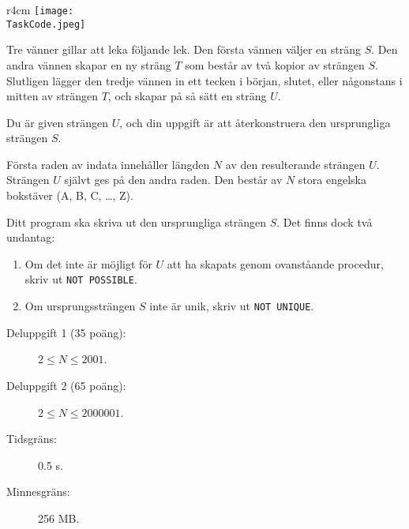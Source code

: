 \documentclass{boi2014-se}
\renewcommand{\TaskCode}{friends}
\begin{document}
    \begin{wrapfigure}{r}{4cm}
        \vspace{-24pt}
		\texttt{[image: \\TaskCode.jpeg]}
	\end{wrapfigure}
    Tre vänner gillar att leka följande lek. Den första vännen väljer en sträng $S$.
    Den andra vännen skapar en ny sträng $T$ som består av två kopior av strängen $S$.
    Slutligen lägger den tredje vännen in ett tecken i början, slutet, eller
    någonstans i mitten av strängen $T$, och skapar på så sätt en sträng $U$.

    \Task
    Du är given strängen $U$, och din uppgift är att återkonstruera den ursprungliga strängen $S$.

    \Input
    Första raden av indata innehåller längden $N$ av den resulterande strängen $U$.
    Strängen $U$ självt ges på den andra raden. Den består av $N$ stora engelska
    bokstäver (A, B, C, \ldots{}, Z).

    \Output
    Ditt program ska skriva ut den ursprungliga strängen $S$.
    Det finns dock två undantag:
    \begin{enumerate}
        \item Om det inte är möjligt för $U$ att ha skapats genom
        ovanståande procedur, skriv ut {\tt NOT POSSIBLE}.
        \item Om ursprungssträngen $S$ inte är unik, skriv ut {\tt NOT UNIQUE}.
    \end{enumerate}
    

    \Examples


    \Scoring

    \begin{description}
        \item[Deluppgift 1 (35 poäng):] $2 \le N \le 2001$.
        \item[Deluppgift 2 (65 poäng):] $2 \le N \le 2000001$.
    \end{description}

    \Constraints

    \begin{description}
        \item[Tidsgräns:] 0.5 s.
        \item[Minnesgräns:] 256 MB.
    \end{description}
\end{document}
